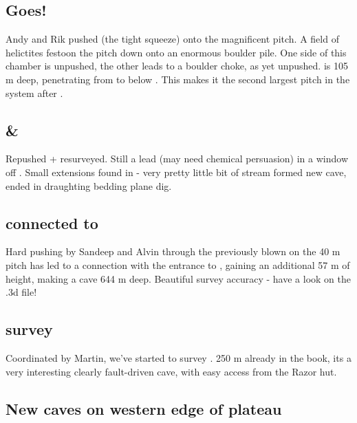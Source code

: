 \subsection{ Goes!}

Andy and Rik pushed  (the tight squeeze) onto the magnificent
 pitch. A field of helictites festoon the pitch down onto an
enormous boulder pile. One side of this chamber is unpushed, the other
leads to a boulder choke, as yet unpushed.  is 105 m
deep, penetrating from  to below . This
makes it the second largest pitch in the system after .

\subsection{ \& }

Repushed + resurveyed. Still a lead (may need chemical persuasion) in a
window off . Small extensions found in  - very pretty little bit of
stream formed new cave, ended in draughting bedding plane dig.

\subsection{ connected to }

Hard pushing by Sandeep and Alvin through the previously blown  on the 40 m  pitch has led to a connection with the 
entrance to , gaining  an additional 57
m of height, making a cave 644 m deep. Beautiful survey accuracy - have
a look on the .3d file!

\subsection{ survey}

Coordinated by Martin, we've started to survey . 250 m
already in the book, its a very interesting clearly fault-driven cave,
with easy access from the Razor hut.

\subsection{New caves on western edge of plateau}

